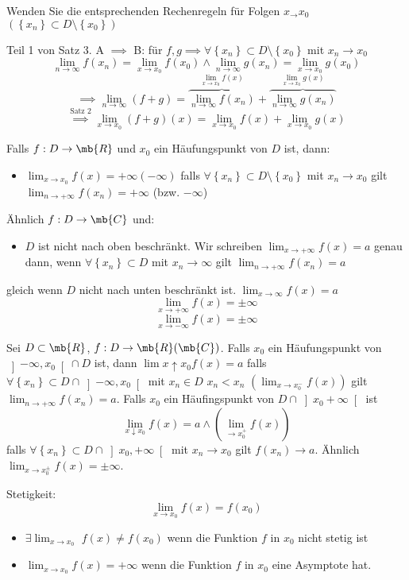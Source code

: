 \begin{Bew}
  Wenden Sie die entsprechenden Rechenregeln für Folgen $x_\to x_0$ $\left( \left\{ x_n \right\}\subset D\setminus \left\{ x_0 \right\} \right)$
\end{Bew}
\begin{Bsp}
  Teil 1 von Satz 3. A $\implies$ B: für $f,g\implies\forall \left\{ x_n \right\}\subset D\setminus \left\{ x_0 \right\}$ mit $x_n\to x_0$
  \[\lim_{n\to \infty} f(x_n)=\lim_{x\to x_0}f(x_0)\wedge\lim_{n\to \infty} g(x_n)=\lim_{x\to x_0}g(x_0)\]
  \[\implies \lim_{n\to\infty}(f+g)=\overbrace{\lim_{n\to\infty}f(x_n)}^{\lim_{x\to x_0}f(x)}+\overbrace{\lim_{n\to \infty}g(x_n)}^{\lim_{x\to x_0}g(x)}\]
  \[\stackrel{\text{Satz 2}}{\implies}\lim_{x\to x_0}(f+g)(x)=\lim_{x\to x_0} f(x)+\lim_{x\to x_0} g(x)\]
\end{Bsp}
\begin{Def}
  Falls $f:D\to\mb{R}$ und $x_0$ ein Häufungspunkt von $D$ ist, dann:
  \begin{itemize}
    \item $\lim_{x\to x_0}f(x)=+\infty(-\infty)$ falls $\forall \left\{ x_n \right\}\subset D\setminus \left\{ x_0 \right\}$ mit $x_n\to x_0$ gilt $\lim_{n\to +\infty}f(x_n)=+\infty$ (bzw. $-\infty$)
  \end{itemize}
  Ähnlich $f:D\to\mb{C}$ und:
  \begin{itemize}
    \item $D$ ist nicht nach oben beschränkt. Wir schreiben $\lim_{x\to+\infty}f(x)=a$ genau dann, wenn $\forall\left\{ x_n \right\}\subset D$ mit $x_n\to\infty$ gilt $\lim_{n\to+\infty}f(x_n)=a$
  \end{itemize}
  gleich wenn $D$ nicht nach unten beschränkt ist. $\lim_{x\to\infty}f(x)=a$
  \[\lim_{x\to+\infty}f(x)=\pm\infty\]
  \[\lim_{x\to-\infty}f(x)=\pm\infty\]
\end{Def}
\begin{Def}
  Sei $D\subset\mb{R}$, $f:D\to\mb{R}(\mb{C})$. Falls $x_0$ ein Häufungspunkt von $\left] -\infty,x_0 \right[\cap D$ ist, dann $\lim{x\uparrow x_0}f(x)=a$ falls $\forall \left\{ x_n \right\}\subset D\cap \left] -\infty, x_0 \right[$ mit $x_n\in D$ $x_n<x_n$ $\left( \lim_{x\to x_0^-}f(x) \right)$ gilt $\lim_{n\to+\infty}f(x_n)=a$. Falls $x_0$ ein Häufingspunkt von $D\cap \left] x_0+\infty \right[$ ist
  \[\lim_{x\downarrow x_0}f(x)=a\wedge(\lim_{\to x_0^+} f(x))\]
  falls $\forall \left\{ x_n \right\}\subset D\cap \left] x_0, +\infty \right[$ mit $x_n\to x_0$ gilt $f(x_n)\to a$. Ähnlich $\lim_{x\to x_0^\pm}f(x)=\pm\infty$.
\end{Def}
\begin{Bsp}
  Stetigkeit:
  \[\lim_{x\to x_0}f(x)=f(x_0)\]
  \begin{itemize}
    \item $\exists \lim_{x\to x_0}$ $f(x)\neq f(x_0)$ wenn die Funktion $f$ in $x_0$ nicht stetig ist
    \item $\lim_{x\to x_0}f(x)=+\infty$ wenn die Funktion $f$ in $x_0$ eine Asymptote hat.
  \end{itemize}
\end{Bsp}
